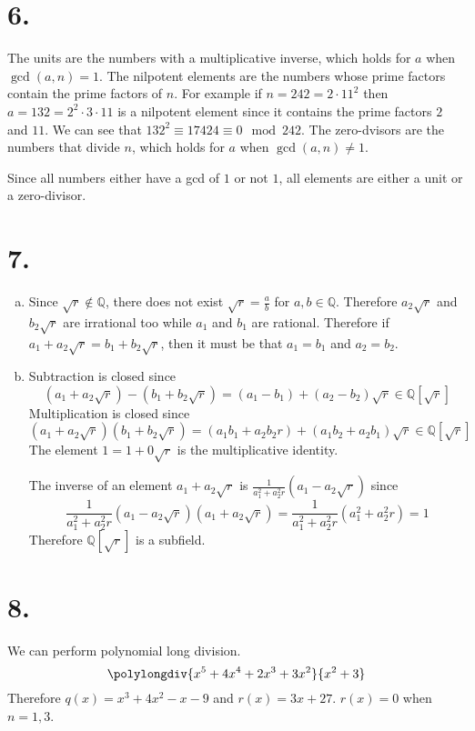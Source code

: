 \documentclass{article}
\begin{document}
\section*{6.}
The units are the numbers with a multiplicative inverse,
which holds for $a$ when $\gcd(a,n) = 1$.
The nilpotent elements are the numbers whose prime
factors contain the prime factors of $n$.
For example if $n=242 = 2\cdot 11^2$ then 
$a=132=2^2\cdot 3 \cdot 11$ is a nilpotent element
since it contains the prime factors $2$ and $11$.
We can see that $132^2 \equiv 17424 \equiv 0 \mod 242$.
The zero-dvisors are the numbers that divide $n$, 
which holds for $a$ when $\gcd(a,n) \neq 1$.

Since all numbers either have a gcd of $1$ or not $1$,
all elements are either a unit or a zero-divisor.

\newpage 

\section*{7.}
\begin{enumerate}[(a)]
	\item Since $\sqrt{r} \notin \mathbb{Q}$,
	there does not exist $\sqrt{r} = \frac{a}{b}$
	for $a,b \in \mathbb{Q}$.
	Therefore $a_2\sqrt{r}$ and $b_2\sqrt{r}$
	are irrational too while $a_1$ and $b_1$ are rational.
	Therefore if $a_1 + a_2\sqrt{r} = b_1 + b_2\sqrt{r}$,
	then it must be that $a_1 = b_1$ and $a_2 = b_2$.
	\item Subtraction is closed since 
	\[	
		(a_1 + a_2\sqrt{r}) - (b_1 + b_2\sqrt{r}) 
		= (a_1-b_1) + (a_2-b_2)\sqrt{r} 
		\in \mathbb{Q}[\sqrt{r}]
	\]
	Multiplication is closed since 
	\[
		(a_1 + a_2\sqrt{r})(b_1 + b_2\sqrt{r})
		= (a_1b_1 + a_2b_2r) + (a_1b_2+a_2b_1)\sqrt{r}
		\in \mathbb{Q}[\sqrt{r}]
	\]
	The element $1 = 1+0\sqrt{r}$ is the multiplicative identity.

	The inverse of an element $a_1 + a_2\sqrt{r}$ is 
	$\frac{1}{a_1^2 + a_2^2r}(a_1 - a_2\sqrt{r})$ since 
	\[
		\frac{1}{a_1^2 + a_2^2r}(a_1 - a_2\sqrt{r})(a_1 + a_2\sqrt{r})
		= \frac{1}{a_1^2 + a_2^2r}(a_1^2 + a_2^2r) 
		= 1
	\]
	Therefore $\mathbb{Q}[\sqrt{r}]$ is a subfield.
\end{enumerate}
\newpage 

\section*{8.}
We can perform polynomial long division.
\[
	\polylongdiv{x^5 + 4x^4 + 2x^3 + 3x^2}{x^2 + 3}
\]
Therefore $q(x) = x^3+4x^2-x-9$ and $r(x) = 3x+27$.
$r(x) = 0$ when $n=1,3$.
\end{document}

